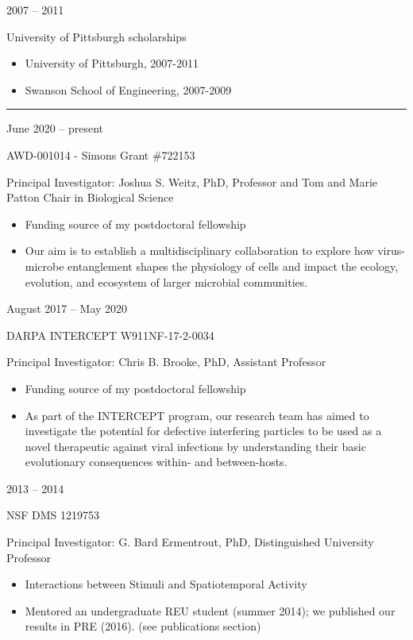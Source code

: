 \documentclass[a4paper,10pt]{article}
\newlength{\cvcolumngapwidth}
\newlength{\cvleftcolumnwidth}
\newlength{\cvrightcolumnwidth}
\newcommand{\cvsectionstyle}[1]{{\normalsize\cvsectionfont\textcolor{cvsectioncolor}{#1}}}
\newcommand{\cvtitlestyle}[1]{{\large\cvtitlefont\textcolor{cvtitlecolor}{#1}}}
\newcommand{\cvheadingstyle}[1]{{\normalsize\cvheadingfont\textcolor{cvheadingcolor}{#1}}}
\newlength{\cvafteritemskipamount}
\newlength{\cvaftersectionskipamount}
\newlength{\cvbetweensectionandheadingextraskipamount}
\newlength{\cvaftertitleskipamount}
\newlength{\cvparskip}
\newcommand{\cvsection}[1]{
            \begin{minipage}[t]{\cvleftcolumnwidth}
                \raggedleft\cvsectionstyle{#1}
            \end{minipage}%
            \hspace{\cvcolumngapwidth}%
            \begin{minipage}[t]{\cvrightcolumnwidth}
                \textcolor{cvrulecolor}{\rule{\cvrightcolumnwidth}{0.3mm}}
            \end{minipage}
        
            \vspace{\cvaftersectionskipamount}
        }
\newcommand{\cvitem}[2]{
            \begin{minipage}[t]{\cvleftcolumnwidth}
                \raggedleft #1
            \end{minipage}%
            \hspace{\cvcolumngapwidth}%
            \begin{minipage}[t]{\cvrightcolumnwidth}
                \setlength{\parskip}{\cvparskip} #2
            \end{minipage}
        
            \vspace{\cvafteritemskipamount}
        }
\newcommand{\cvtitle}[1]{
            \cvtitlestyle{#1}
        
            \vspace{\cvaftertitleskipamount}
            \vspace{-\cvparskip}
        }
\begin{document}
        
        \cvitem{
            \cvheadingstyle{2007 -- 2011}
        }{
                \cvtitle{University of Pittsburgh scholarships} 
                \begin{itemize}[leftmargin=*]
                \item University of Pittsburgh, 2007-2011
                \item Swanson School of Engineering, 2007-2009
                \end{itemize}
        }
        
       
        \cvsection{FUNDING ACKNOWLEDGMENTS}
        \vspace{\cvbetweensectionandheadingextraskipamount}

        \cvitem{
            \cvheadingstyle{June 2020 -- present}
        }{
            \cvtitle{AWD-001014 - Simons Grant \#722153} 
            Principal Investigator: Joshua S. Weitz, PhD, Professor and Tom and Marie Patton Chair in Biological Science
            \begin{itemize}
        	\item Funding source of my postdoctoral fellowship
            	\item Our aim is to establish a multidisciplinary collaboration to explore how virus-microbe entanglement shapes the physiology of cells and impact the ecology, evolution, and ecosystem of larger microbial communities.
            \end{itemize}
            
        }
                
        \cvitem{
            \cvheadingstyle{August 2017 -- May 2020}
        }{
            \cvtitle{DARPA INTERCEPT W911NF-17-2-0034} 
            Principal Investigator: Chris B. Brooke, PhD, Assistant Professor
            \begin{itemize}
        	\item Funding source of my postdoctoral fellowship
            	\item As part of the INTERCEPT program, our research team has aimed to investigate the potential for defective interfering particles to be used as a novel therapeutic against viral infections by understanding their basic evolutionary consequences within- and between-hosts.
            \end{itemize}
            
        }
        
        \cvitem{
            \cvheadingstyle{2013 -- 2014}
        }{
            \cvtitle{NSF DMS 1219753} 
            Principal Investigator: G. Bard Ermentrout, PhD, Distinguished University Professor
            \begin{itemize}
                \item Interactions between Stimuli and Spatiotemporal Activity
                \item Mentored an undergraduate REU student (summer 2014); we published our results in PRE (2016). (see publications section) \\
            \end{itemize}
            
        }
        
\end{document}
